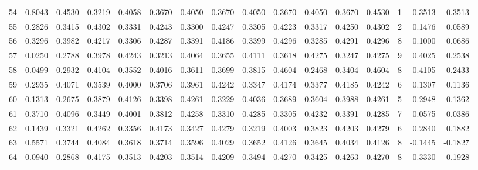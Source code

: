 \begin{tabular}{lrrrrrrrrrrrrrrr}
54  &      0.8043 &  0.4530 &  0.3219 &  0.4058 &  0.3670 &  0.4050 &  0.3670 &  0.4050 &  0.3670 &  0.4050 &   0.3670 &     0.4530 &      1 &                   -0.3513 &                    -0.3513 \\
55  &      0.2826 &  0.3415 &  0.4302 &  0.3331 &  0.4243 &  0.3300 &  0.4247 &  0.3305 &  0.4223 &  0.3317 &   0.4250 &     0.4302 &      2 &                    0.1476 &                     0.0589 \\
56  &      0.3296 &  0.3982 &  0.4217 &  0.3306 &  0.4287 &  0.3391 &  0.4186 &  0.3399 &  0.4296 &  0.3285 &   0.4291 &     0.4296 &      8 &                    0.1000 &                     0.0686 \\
57  &      0.0250 &  0.2788 &  0.3978 &  0.4243 &  0.3213 &  0.4064 &  0.3655 &  0.4111 &  0.3618 &  0.4275 &   0.3247 &     0.4275 &      9 &                    0.4025 &                     0.2538 \\
58  &      0.0499 &  0.2932 &  0.4104 &  0.3552 &  0.4016 &  0.3611 &  0.3699 &  0.3815 &  0.4604 &  0.2468 &   0.3404 &     0.4604 &      8 &                    0.4105 &                     0.2433 \\
59  &      0.2935 &  0.4071 &  0.3539 &  0.4000 &  0.3706 &  0.3961 &  0.4242 &  0.3347 &  0.4174 &  0.3377 &   0.4185 &     0.4242 &      6 &                    0.1307 &                     0.1136 \\
60  &      0.1313 &  0.2675 &  0.3879 &  0.4126 &  0.3398 &  0.4261 &  0.3229 &  0.4036 &  0.3689 &  0.3604 &   0.3988 &     0.4261 &      5 &                    0.2948 &                     0.1362 \\
61  &      0.3710 &  0.4096 &  0.3449 &  0.4001 &  0.3812 &  0.4258 &  0.3310 &  0.4285 &  0.3305 &  0.4232 &   0.3391 &     0.4285 &      7 &                    0.0575 &                     0.0386 \\
62  &      0.1439 &  0.3321 &  0.4262 &  0.3356 &  0.4173 &  0.3427 &  0.4279 &  0.3219 &  0.4003 &  0.3823 &   0.4203 &     0.4279 &      6 &                    0.2840 &                     0.1882 \\
63  &      0.5571 &  0.3744 &  0.4084 &  0.3618 &  0.3714 &  0.3596 &  0.4029 &  0.3652 &  0.4126 &  0.3645 &   0.4034 &     0.4126 &      8 &                   -0.1445 &                    -0.1827 \\
64  &      0.0940 &  0.2868 &  0.4175 &  0.3513 &  0.4203 &  0.3514 &  0.4209 &  0.3494 &  0.4270 &  0.3425 &   0.4263 &     0.4270 &      8 &                    0.3330 &                     0.1928 \\

\end{tabular}
